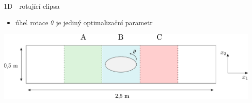 \documentclass[aspectratio=169,xcolor=dvipsnames]{beamer}
\begin{document}
\begin{frame}{1D - rotující elipsa}
	\begin{itemize}
	\item úhel rotace $ \theta $ je jediný optimalizační parametr
	\vspace{7mm}
	\end{itemize}
	\includegraphics[width=1\linewidth, trim={0 0 0 0}, clip]{Images/elipsa1.pdf}			
\end{frame}
\end{document}
